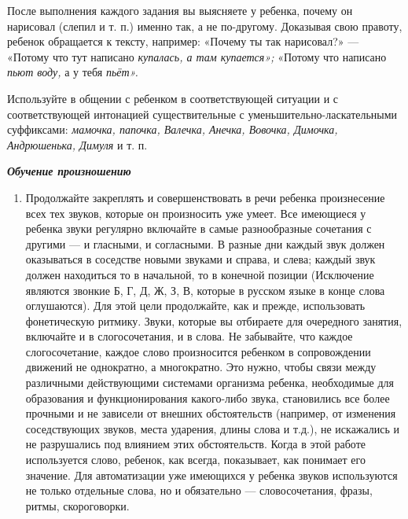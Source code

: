 \documentclass{book}
\renewcommand{\emph}[1]{\textit{#1}}
\begin{document}
После выполнения каждого задания вы выясняете у ребенка, почему он
нарисовал (слепил и т. п.) именно так, а не по-другому. Доказывая свою
правоту, ребенок обращается к тексту, например: «Почему ты так
нарисовал?» --- «Потому что тут написано \emph{купалась, а там
купается»;} «Потому что написано \emph{пьют воду,} а у тебя
\emph{пьёт».}

Используйте в общении с ребенком в соответствующей ситуации и с
соответствующей интонацией существительные с уменьшительно-ласкательными
суффиксами: \emph{мамочка, папочка, Валечка, Анечка, Вовочка, Димочка,
Андрюшенька, Димуля} и т. п.

\emph{\textbf{Обучение произношению}}


\begin{enumerate}
\def\labelenumi{\arabic{enumi}.}
\item
  
  Продолжайте закреплять и совершенствовать в речи ребенка произнесение
  всех тех звуков, которые он произносить уже умеет. Все имеющиеся у
  ребенка звуки регулярно включайте в самые разнообразные сочетания с
  другими --- и гласными, и согласными. В разные дни каждый звук должен
  оказываться в соседстве новыми звуками и справа, и слева; каждый звук
  должен находиться то в начальной, то в конечной позиции (Исключение
  являются звонкие Б, Г, Д, Ж, З, В, которые в русском языке в конце
  слова оглушаются). Для этой цели продолжайте, как и прежде,
  использовать фонетическую ритмику. Звуки, которые вы отбираете для
  очередного занятия, включайте и в слогосочетания, и в слова. Не
  забывайте, что каждое слогосочетание, каждое слово произносится
  ребенком в сопровождении движений не однократно, а многократно. Это
  нужно, чтобы связи между различными действующими системами организма
  ребенка, необходимые для образования и функционирования какого-либо
  звука, становились все более прочными и не зависели от внешних
  обстоятельств (например, от изменения соседствующих звуков, места
  ударения, длины слова и т.д.), не искажались и не разрушались под
  влиянием этих обстоятельств. Когда в этой работе используется слово,
  ребенок, как всегда, показывает, как понимает его значение. Для
  автоматизации уже имеющихся у ребенка звуков используются не только
  отдельные слова, но и обязательно --- словосочетания, фразы, ритмы,
  скороговорки.
  
\end{enumerate}
\end{document}
